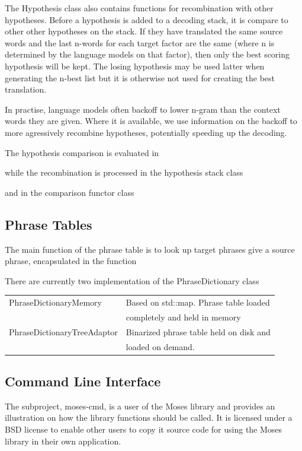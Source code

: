 \documentclass[11pt]{report}
\theoremstyle{plain}
\begin{document}
{The Hypothesis class also contains functions for recombination with other hypotheses. Before a hypothesis is added to a decoding stack, it is compare to other other hypotheses on the stack. If they have translated the same source words and the last n-words for each target factor are the same (where n is determined by the language models on that factor), then only the best scoring hypothesis will be kept. The losing hypothesis may be used latter when generating the n-best list but it is otherwise not used for creating the best translation.

In practise, language models often backoff to lower n-gram than the context words they are given. Where it is available, we use information on the backoff to more agressively recombine hypotheses, potentially speeding up the decoding.

The hypothesis comparison is evaluated in \\

while the recombination is processed in the hypothesis stack class\\

and in the comparison functor class\\


\subsection{Phrase Tables}	
The main function of the phrase table is to look up target phrases give a source phrase, encapsulated in the function\\

There are currently two implementation of the PhraseDictionary class

\begin{tabular}{|l|l|}
\hline
PhraseDictionaryMemory & Based on std::map. Phrase table loaded\\ 
 & completely and held in memory\\
PhraseDictionaryTreeAdaptor & Binarized phrase table held on disk and \\
 & loaded on demand.\\
\hline
\end{tabular}

\subsection{Command Line Interface}
The subproject, moses-cmd, is a user of the Moses library and provides an illustration on how the library functions should be called. It is licensed under a BSD license to enable other users to copy it source code for using the Moses library in their own application.

}
\end{document}
